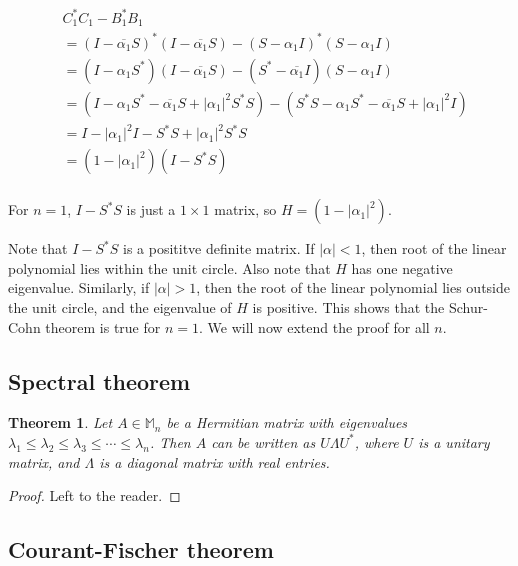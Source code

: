\documentclass[twofold]{article}
\newcommand*\conj[1]{\overline{#1}}
\newcommand*\adj[1]{#1^*}
\newcommand*\abs[1]{\left \vert #1 \right\vert}
\theoremstyle{plain}
\newtheorem{theorem}{Theorem}
\theoremstyle{definition}
\theoremstyle{remark}
\begin{document}
\begin{equation*}
\begin{split}
&    \adj{C_1}C_1 - \adj{B_1} B_1 \\
 & = \adj{(I - \conj{\alpha_1}S)} (I - \conj{\alpha_1}S) - \adj{(S - \alpha_1 I)} (S - \alpha_1 I) \\
& = (I - \alpha_1\adj{S}) (I - \conj{\alpha_1}S) - (\adj{S} - \conj{\alpha_1} I) (S - \alpha_1 I) \\
 & = (I - \alpha_1\adj{S} - \conj{\alpha_1}S + \abs{\alpha_1}^2 \adj{S} S) - (\adj{S} S - \alpha_1 \adj{S} - \conj{\alpha_1} S + \abs{\alpha_1}^2I)\\
& = I - \abs{\alpha_1}^2 I - \adj{S} S + \abs{\alpha_1}^2 \adj{S} S \\
& = (1 - \abs{\alpha_1}^2) (I - \adj{S} S) \\
\end{split}
\end{equation*}

For \(n = 1\), \(I - \adj{S}S\) is just a \(1 \times 1\) matrix, so \(H = (1 - \abs{\alpha_1}^2)\). 



Note that \(I - \adj{S} S\) is a posititve definite matrix. If \(\abs{\alpha} < 1\), then root of the linear polynomial lies within the unit circle. Also note that \(H\) has one negative eigenvalue. Similarly, if \(\abs{\alpha} > 1\), then the root of the linear polynomial lies outside the unit circle, and the eigenvalue of \(H\) is positive. This shows that the Schur-Cohn theorem is true for \(n = 1\). We will now extend the proof for all \(n\). 

\subsection{Spectral theorem}

\begin{theorem} Let \(A \in \mathbb{M}_n\) be a Hermitian matrix with eigenvalues \(\lambda_1 \le \lambda_2 \le \lambda_3 \le \cdots \le \lambda_n\). Then \(A\) can be written as \(U \Lambda \adj{U} \), where \(U\) is a unitary matrix, and \(\Lambda\) is a diagonal matrix with real entries. \end{theorem}

\begin{proof} Left to the reader. \end{proof}

\subsection{Courant-Fischer theorem}
\end{document}

